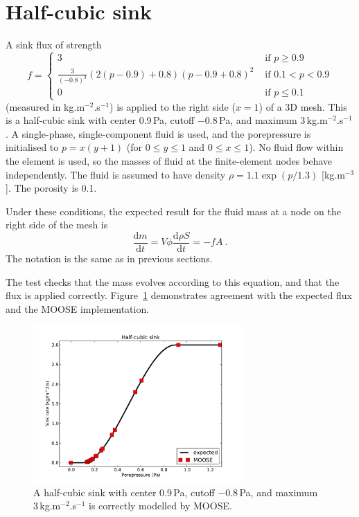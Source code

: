 \documentclass[]{scrreprt}
\def\d{\mathrm{d}}
\begin{document}
\section{Half-cubic sink}
\label{half_cubic.sec}

A sink flux of strength
\begin{equation}
f = \left\{
\begin{array}{ll}
3 & \mbox{ if } p \geq 0.9 \\
\frac{3}{(-0.8)^3} (2(p-0.9) + 0.8) (p - 0.9 + 0.8)^2 & \mbox{ if }
0.1 < p < 0.9 \\
0 & \mbox{ if } p \leq 0.1
\end{array}
\right.
\end{equation}
(measured in kg.m$^{-2}$.s$^{-1}$) is applied to the right side
($x=1$) of a 3D mesh.  This is a half-cubic sink with center
0.9\,Pa, cutoff $-0.8$\,Pa, and maximum 3\,kg.m$^{-2}$.s$^{-1}$.  A
single-phase, single-component fluid is used, and the porepressure is
initialised to $p=x(y+1)$ (for $0\leq y \leq 1$ and $0\leq x \leq 1$).
No fluid flow within the element is used, so the masses of fluid at
the finite-element nodes behave independently.  The fluid is assumed
to have density $\rho = 1.1 \exp(p/1.3)$ [kg.m$^{-3}$].  The porosity
is 0.1.

Under these conditions, the expected result for the fluid mass at a
node on the right side of the mesh is
\begin{equation}
\frac{\d m}{\d t} = V\phi \frac{\d \rho S}{\d t} = -f A \ .
\end{equation}
The notation is the same as in previous sections.

The test checks that the mass evolves according to this equation, and
that the flux is applied correctly.  Figure~\ref{s06.fig} demonstrates
agreement with the expected flux and the MOOSE implementation.

\begin{figure}[htb]
\begin{center}
\includegraphics[width=8cm]{s06.pdf}
\caption{A half-cubic sink with center 0.9\,Pa, cutoff $-0.8$\,Pa, and
  maximum 3\,kg.m$^{-2}$.s$^{-1}$ is correctly modelled by MOOSE.}
\label{s06.fig}
\end{center}
\end{figure}
\end{document}
